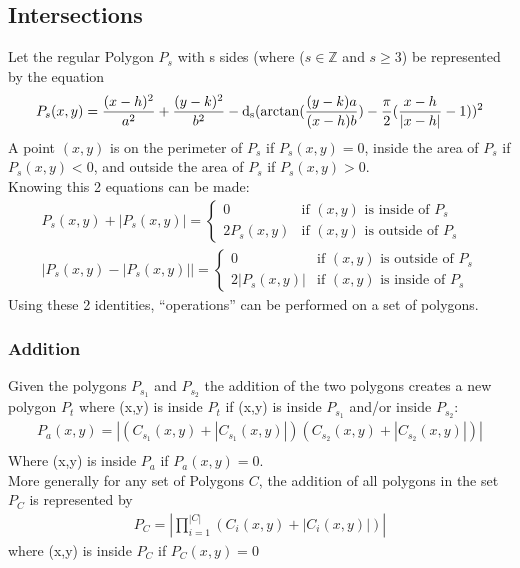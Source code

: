 \documentclass[11pt]{article}
\DeclareMathOperator{\custdsq}{\mathrm{d}_s}
\DeclarePairedDelimiter\abs{\lvert}{\rvert}%
\begin{document}
\subsection{Intersections}
Let the regular Polygon \(P_s\) with s sides (where (\(s\in\mathbb{Z}\) and \(s\geq3\)) be represented by the equation
\begin{gather*}
P_s(x,y)=\frac{(x-h)^2}{a^2}+\frac{(y-k)^2}{b^2}-\custdsq(\arctan(\frac{(y-k)a}{(x-h)b})-\frac{\pi}{2}(\frac{x-h}{\abs{x-h}}-1))^2
\end{gather*}
A point \((x,y)\) is on the perimeter of \(P_s\) if \(P_s(x,y)=0\), inside the area of \(P_s\) if \(P_s(x,y)<0\), and outside the area of \(P_s\) if \(P_s(x,y)>0\).\\
Knowing this 2 equations can be made:
\begin{equation*}
\begin{split}
P_s(x,y)+|P_s(x,y)|=\begin{cases}
0 & \text{if } (x,y) \text{ is inside of } P_s \\
2P_s(x,y) & \text{if } (x,y) \text{ is outside of } P_s
\end{cases}\\
|P_s(x,y)-|P_s(x,y)||=\begin{cases}
0 & \text{if } (x,y) \text{ is outside of } P_s \\
2|P_s(x,y)| & \text{if } (x,y) \text{ is inside of } P_s
\end{cases}
\end{split}
\end{equation*}
Using these 2 identities, “operations” can be performed on a set of polygons.

\subsubsection{Addition}
Given the polygons \(P_{s_1}\) and \(P_{s_2}\) the addition of the two polygons creates a new polygon \(P_t\) where (x,y) is inside \(P_t\) if (x,y) is inside \(P_{s_1}\) and/or inside \(P_{s_2}\):
\begin{gather*}
P_a(x,y)=|(C_{s_1}(x,y)+|C_{s_1}(x,y)|)(C_{s_2}(x,y)+|C_{s_2}(x,y)|)|\\
\end{gather*}
Where (x,y) is inside \(P_a\) if \(P_a(x,y)=0\).\\
More generally for any set of Polygons \(C\), the addition of all polygons in the set \(P_C\) is represented by
\begin{gather*}
P_C=\left| \prod_{i=1}^{|C|}(C_i(x,y)+|C_i(x,y)|)\right|
\end{gather*}
where (x,y) is inside \(P_C\) if \(P_C(x,y)=0\)
\end{document}
